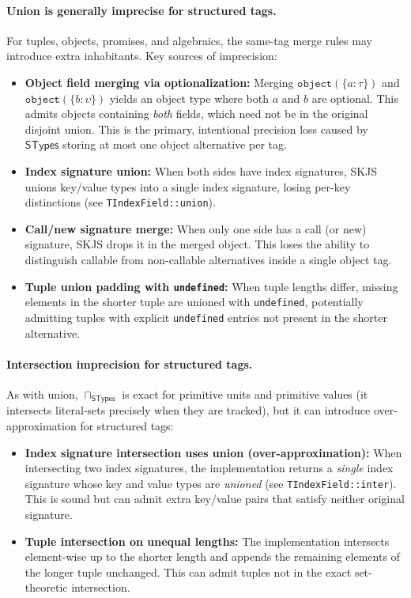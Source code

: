 \documentclass[11pt]{article}
\newcommand{\STypes}{\mathsf{STypes}}
\begin{document}
\paragraph{Union is generally imprecise for structured tags.}
For tuples, objects, promises, and algebraics, the same-tag merge rules may introduce extra inhabitants.
Key sources of imprecision:
\begin{itemize}
\item \textbf{Object field merging via optionalization:}
  Merging \(\texttt{object}(\{a:\tau\})\) and \(\texttt{object}(\{b:\upsilon\})\) yields an object type where both \(a\) and \(b\) are optional.
  This admits objects containing \emph{both} fields, which need not be in the original disjoint union.
  This is the primary, intentional precision loss caused by \(\STypes\) storing at most one object alternative per tag.

\item \textbf{Index signature union:}
  When both sides have index signatures, SKJS unions key/value types into a single index signature, losing per-key distinctions (see \texttt{TIndexField::union}).

\item \textbf{Call/new signature merge:}
  When only one side has a call (or new) signature, SKJS drops it in the merged object.
  This loses the ability to distinguish callable from non-callable alternatives inside a single object tag.

\item \textbf{Tuple union padding with \texttt{undefined}:}
  When tuple lengths differ, missing elements in the shorter tuple are unioned with \texttt{undefined}, potentially admitting tuples with explicit \texttt{undefined} entries not present in the shorter alternative.
\end{itemize}

\paragraph{Intersection imprecision for structured tags.}
As with union, \(\sqcap_{\STypes}\) is exact for primitive units and primitive values (it intersects literal-sets precisely when they are tracked), but it can introduce over-approximation for structured tags:
\begin{itemize}
\item \textbf{Index signature intersection uses union (over-approximation):}
  When intersecting two index signatures, the implementation returns a \emph{single} index signature whose key and value types are \emph{unioned} (see \texttt{TIndexField::inter}).
  This is sound but can admit extra key/value pairs that satisfy neither original signature.

\item \textbf{Tuple intersection on unequal lengths:}
  The implementation intersects element-wise up to the shorter length and appends the remaining elements of the longer tuple unchanged.
  This can admit tuples not in the exact set-theoretic intersection.
\end{itemize}
\end{document}
